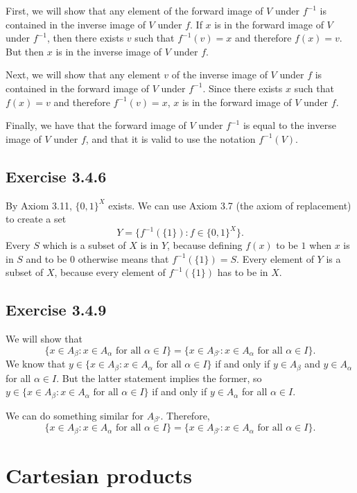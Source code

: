 \documentclass[12pt, oneside]{book}
\begin{document}
	First, we will show that any element of the forward image of $V$ under $f^{-1}$ is contained in the inverse image of $V$ under $f$. If $x$ is in the forward image of $V$ under $f^{-1}$, then there exists $v$ such that $f^{-1}(v) = x$ and therefore $f(x) = v$. But then $x$ is in the inverse image of $V$ under $f$.

	Next, we will show that any element $v$ of the inverse image of $V$ under $f$ is contained in the forward image of $V$ under $f^{-1}$. Since there exists $x$ such that $f(x) = v$ and therefore $f^{-1}(v) = x$, $x$ is in the forward image of $V$ under $f$.

	Finally, we have that the forward image of $V$ under $f^{-1}$ is equal to the inverse image of $V$ under $f$, and that it is valid to use the notation $f^{-1}(V)$.

	\subsection*{Exercise 3.4.6}

	By Axiom 3.11, $\{0, 1\}^X$ exists. We can use Axiom 3.7 (the axiom of replacement) to create a set \[Y = \{f^{-1}(\{1\}): f \in \{0, 1\}^X\}.\] Every $S$ which is a subset of $X$ is in $Y$, because defining $f(x)$ to be $1$ when $x$ is in $S$ and to be $0$ otherwise means that $f^{-1}(\{1\}) = S$. Every element of $Y$ is a subset of $X$, because every element of $f^{-1}(\{1\})$ has to be in $X$.

	\subsection*{Exercise 3.4.9}

	We will show that \[\{x \in A_\beta: x \in A_\alpha \text{ for all } \alpha \in I\} = \{x \in A_{\beta'}: x \in A_\alpha \text{ for all } \alpha \in I\}.\] We know that $y \in \{x \in A_\beta: x \in A_\alpha \text{ for all } \alpha \in I\}$ if and only if $y \in A_\beta$ and $y \in A_\alpha$ for all $\alpha \in I$. But the latter statement implies the former, so $y \in \{x \in A_\beta: x \in A_\alpha \text{ for all } \alpha \in I\}$ if and only if $y \in A_\alpha$ for all $\alpha \in I$.

	We can do something similar for $A_{\beta'}$. Therefore, \[\{x \in A_\beta: x \in A_\alpha \text{ for all } \alpha \in I\} = \{x \in A_{\beta'}: x \in A_\alpha \text{ for all } \alpha \in I\}.\]

	\section{Cartesian products}
\end{document}
